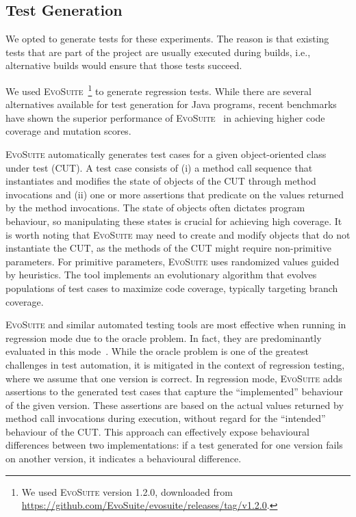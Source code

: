 \documentclass[conference]{IEEEtran}
\makeatletter
\newcommand{\evosuite}{\textsc{EvoSuite}\@\xspace}
\newcommand{\valerio}[1]{\textbf{\textcolor{blue}{[ \ding{46}Valerio: #1]}}}
\renewcommand{\valerio}[1]{}
\makeatother
\begin{document}
\subsection{Test Generation}

We opted to generate tests for these experiments. The reason is that existing tests that are part of the project are usually executed during builds, i.e., alternative builds would ensure that those tests succeed. 

We used \evosuite~\footnote{We used \evosuite version 1.2.0, downloaded from \url{https://github.com/EvoSuite/evosuite/releases/tag/v1.2.0}.} to generate regression tests. While there are several alternatives available for test generation for Java programs, recent benchmarks have shown the superior performance of \evosuite~\cite{jahangirova2023sbft} in achieving higher code coverage and mutation scores. 

\evosuite automatically generates test cases for a given object-oriented class under test (CUT). A test case consists of (i) a method call sequence that instantiates and modifies the state of objects of the CUT through method invocations and (ii) one or more assertions that predicate on the values returned by the method invocations. The state of objects often dictates program behaviour, so manipulating these states is crucial for achieving high coverage. It is worth noting that \evosuite may need to create and modify objects that do not instantiate the CUT, as the methods of the CUT might require non-primitive parameters. For primitive parameters, \evosuite uses randomized values guided by heuristics. The tool implements an evolutionary algorithm that evolves populations of test cases to maximize code coverage, typically targeting branch coverage.

\evosuite and similar automated testing tools are most effective when running in regression mode due to the oracle problem. In fact, they are predominantly evaluated in this mode~\cite{jahangirova2023sbft,shamshiri2015automatically}. While the oracle problem is one of the greatest challenges in test automation, it is mitigated in the context of regression testing, where we assume that one version is correct. In regression mode, \evosuite adds assertions to the generated test cases that capture the ``implemented'' behaviour of the given version. These assertions are based on the actual values returned by method call invocations during execution, without regard for the ``intended'' behaviour of the CUT. This approach can effectively expose behavioural differences between two implementations: if a test generated for one version fails on another version, it indicates a behavioural difference.
\end{document}
